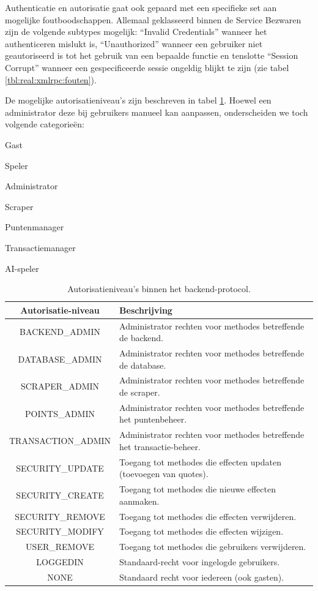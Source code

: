 Authenticatie en autorisatie gaat ook gepaard met een specifieke set aan mogelijke foutboodschappen. Allemaal geklasseerd binnen de Service Bezwaren zijn de volgende subtypes mogelijk: ``Invalid Credentials'' wanneer het authenticeren mislukt is, ``Unauthorized'' wanneer een gebruiker niet geautoriseerd is tot het gebruik van een bepaalde functie en tenslotte ``Session Corrupt'' wanneer een gespecificeerde sessie ongeldig blijkt te zijn (zie tabel \ref{tbl:real:xmlrpc:fouten}).

De mogelijke autorisatieniveau's zijn beschreven in tabel \ref{tbl:real:xmlrpc:autorisatie}. Hoewel een administrator deze bij gebruikers manueel kan aanpassen, onderscheiden we toch volgende categorie\"en:
\begin{itemize_compact}
\item{Gast}
\item{Speler}
\item{Administrator}
\item{Scraper}
\item{Puntenmanager}
\item{Transactiemanager}
\item{AI-speler}
\end{itemize_compact}

\begin{table}
\begin{tabular}{| c p{7cm} |}
	\hline
	Autorisatie-niveau & Beschrijving \\
	\hline
	
	BACKEND\_ADMIN & Administrator rechten voor methodes betreffende de backend. \\
	DATABASE\_ADMIN & Administrator rechten voor methodes betreffende de database. \\
	SCRAPER\_ADMIN & Administrator rechten voor methodes betreffende de scraper. \\
	POINTS\_ADMIN & Administrator rechten voor methodes betreffende het puntenbeheer. \\
	TRANSACTION\_ADMIN & Administrator rechten voor methodes betreffende het transactie-beheer. \\
	
	SECURITY\_UPDATE & Toegang tot methodes die effecten updaten (toevoegen van quotes). \\
	SECURITY\_CREATE & Toegang tot methodes die nieuwe effecten aanmaken. \\
	SECURITY\_REMOVE & Toegang tot methodes die effecten verwijderen. \\
	SECURITY\_MODIFY & Toegang tot methodes die effecten wijzigen. \\
	
	USER\_REMOVE & Toegang tot methodes die gebruikers verwijderen. \\
	
	LOGGEDIN & Standaard-recht voor ingelogde gebruikers. \\
	NONE & Standaard recht voor iedereen (ook gasten). \\
	
	\hline
\end{tabular}
\caption{Autorisatieniveau's binnen het backend-protocol.}
\label{tbl:real:xmlrpc:autorisatie}
\end{table}

